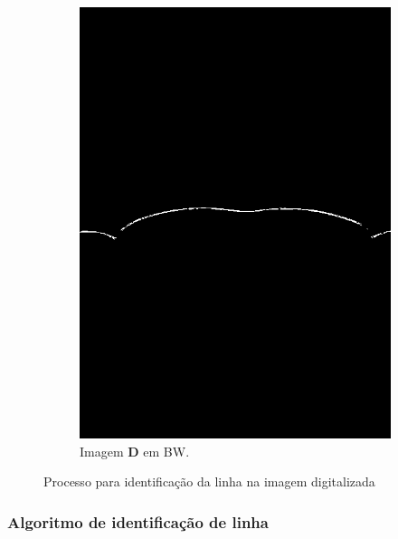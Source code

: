 \documentclass[a4paper, 12pt]{article}
\begin{document}
\begin{figure}[!h]
\begin{subfigure}[b]{0.4\textwidth}
         \includegraphics[width=\textwidth]{grayscale.jpg}
         \caption{Imagem $\mathbf{D}$ em BW.}
         \label{fig:cordetect:bw}
     \end{subfigure}
\caption{Processo para identificação da linha na imagem digitalizada}
\label{fig:cordetect}
\end{figure}

\subsubsection{Algoritmo de identificação de linha}
\end{document}
